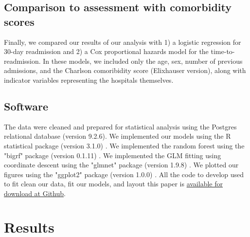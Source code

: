 \documentclass[]{article}\usepackage[]{graphicx}\usepackage[]{color}
\begin{document}


\subsection{Comparison to assessment with comorbidity scores}
Finally, we compared our results of our analysis with 1) a logistic regression for 30-day readmission and 2) a Cox proportional hazards model for the time-to-readmission. In these models, we included only the age, sex, number of previous admissions, and the Charlson comoribidity score (Elixhauser version), along with indicator variables representing the hospitals themselves.

\subsection{Software}
The data were cleaned and prepared for statistical analysis using the Postgres relational database (version 9.2.6). We implemented our models using the R statistical package (version 3.1.0) \supercite{team_r:_2014}. We implemented the random forest using the "bigrf" package (version 0.1.11) \supercite{lim_bigrf:_2014}. We implemented the GLM fitting using coordinate descent using the "glmnet" package (version 1.9.8) \supercite{friedman_regularization_2010}. We plotted our figures using the "ggplot2" package (version 1.0.0) \supercite{wickham_ggplot2:_2009}. All the code to develop used to fit clean our data, fit our models, and layout this paper is \href{https://github.com/nograpes/tmle_readmissions}{available for download at Github}.

\section{Results}
\end{document}
